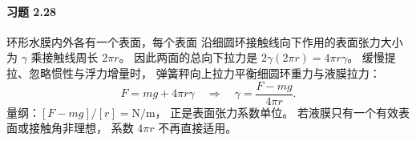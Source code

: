 \paragraph{习题 2.28}
环形水膜内外各有一个表面，每个表面
沿细圆环接触线向下作用的表面张力大小为
\(\gamma\) 乘接触线周长 \(2\pi r\)。
因此两面的总向下拉力是
\(2\gamma(2\pi r)=4\pi r\gamma\)。
缓慢提拉、忽略惯性与浮力增量时，
弹簧秤向上拉力平衡细圆环重力与液膜拉力：
\[
 F=mg+4\pi r\gamma
 \quad\Longrightarrow\quad
 \boxed{\gamma=\frac{F-mg}{4\pi r}}.
\]
量纲：\([F-mg]/[r]=\mathrm{N/m}\)，
正是表面张力系数单位。
若液膜只有一个有效表面或接触角非理想，
系数 \(4\pi r\) 不再直接适用。
